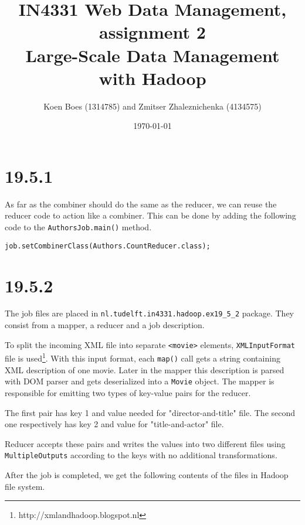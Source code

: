 \documentclass[a4paper, notitlepage]{article}
\begin{document}
\title{IN4331 Web Data Management, assignment 2 \\
Large-Scale Data Management with Hadoop}
\author{Koen Boes (1314785) and Zmitser Zhaleznichenka (4134575)}
\date{\today}
\maketitle

\setcounter{secnumdepth}{0}

\section{19.5.1}

As far as the combiner should do the same as the reducer, we can reuse the reducer code to action like a combiner. This can be done by adding the following code to the \lstinline{AuthorsJob.main()} method.

\begin{lstlisting}
job.setCombinerClass(Authors.CountReducer.class);  
\end{lstlisting}

\section{19.5.2}

The job files are placed in \lstinline{nl.tudelft.in4331.hadoop.ex19_5_2} package. They consist from a mapper, a reducer and a job description.

To split the incoming XML file into separate \lstinline{<movie>} elements, \lstinline{XMLInputFormat} file is used\footnote{http://xmlandhadoop.blogspot.nl}. With this input format, each \lstinline{map()} call gets a string containing XML description of one movie. Later in the mapper this description is parsed with DOM parser and gets deserialized into a \lstinline{Movie} object. The mapper is responsible for emitting two types of key-value pairs for the reducer.

The first pair has key 1 and value needed for "director-and-title" file. The second one respectively has key 2 and value for "title-and-actor" file.

Reducer accepts these pairs and writes the values into two different files using \lstinline{MultipleOutputs} according to the keys with no additional transformations. 

After the job is completed, we get the following contents of the files in Hadoop file system.
\end{document}
